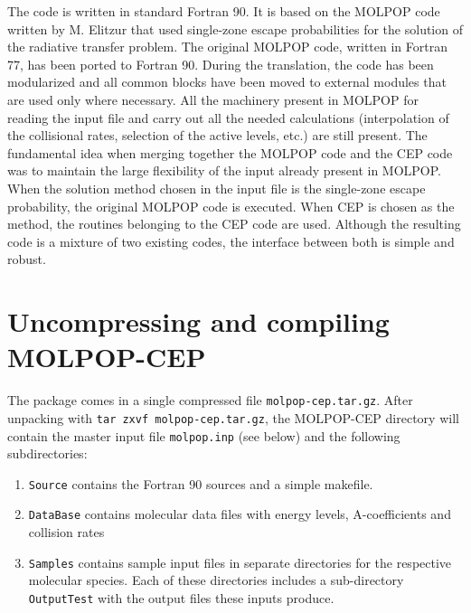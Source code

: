 \documentclass[12pt]{article}
\begin{document}
The code is written in standard Fortran 90. It is based on the MOLPOP code
written by M. Elitzur that used single-zone escape probabilities for the
solution of the radiative transfer problem. The original MOLPOP code, written
in Fortran 77, has been ported to Fortran 90. During the translation, the code
has been modularized and all common blocks have been moved to external modules
that are used only where necessary. All the machinery present in MOLPOP for
reading the input file and carry out all the needed calculations (interpolation
of the collisional rates, selection of the active levels, etc.) are still
present. The fundamental idea when merging together the MOLPOP code and the CEP
code was to maintain the large flexibility of the input already present in
MOLPOP. When the solution method chosen in the input file is the single-zone
escape probability, the original MOLPOP code is executed. When CEP is chosen as
the method, the routines belonging to the CEP code are used. Although the
resulting code is a mixture of two existing codes, the interface between both
is simple and robust.

\section{Uncompressing and compiling MOLPOP-CEP}

The package comes in a single compressed file \texttt{molpop-cep.tar.gz}. After
unpacking with \texttt{tar zxvf molpop-cep.tar.gz}, the MOLPOP-CEP directory
will contain the master input file \texttt{molpop.inp} (see below) and the
following subdirectories:

\begin{enumerate}
\item
{\tt Source} contains the Fortran 90 sources and a simple makefile.
\item
{\tt DataBase} contains molecular data files with energy levels,
A-coefficients and collision rates
\item
{\tt Samples} contains sample input files in separate directories for the
respective molecular species. Each of these directories includes a
sub-directory \texttt{OutputTest} with the output files these inputs produce.
\end{enumerate}
\end{document}

